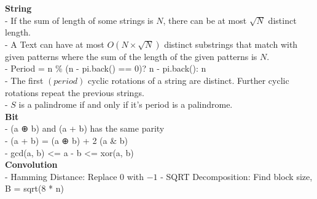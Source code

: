 \textbf{String} \\
- If the sum of length of some strings is \( N \), there can be at most \( \sqrt{N} \) distinct length. \\
- A Text can have at most \( O(N \times \sqrt{N}) \) distinct substrings that match with given patterns where the sum of the length of the given patterns is \( N \). \\
- Period =  n \% (n - pi.back() == 0)? n - pi.back(): n \\
- The first \( (period) \) cyclic rotations of a string are distinct. Further cyclic rotations repeat the previous strings. \\
- \( S \) is a palindrome if and only if it's period is a palindrome. \\

\textbf{Bit} \\
- (a ⊕ b) and (a + b) has the same parity \\
- (a + b) = (a ⊕ b) + 2 (a & b) \\
- gcd(a, b) <= a - b <= xor(a, b) \\

\textbf{Convolution} \\
- Hamming Distance: Replace \( 0 \) with \( -1 \)
- SQRT Decomposition: Find block size, B = sqrt(8 * n)